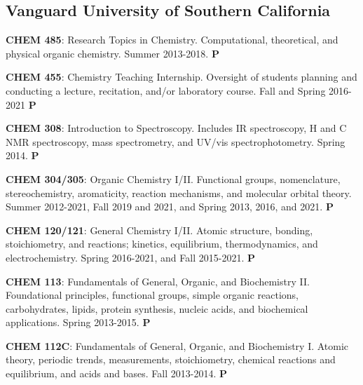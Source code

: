 \documentclass[10pt]{article}
\newcommand*\teitem[4]{\textbf{#1}: #2 #3 \textbf{#4}}
\begin{document}

\subsection*{Vanguard University of Southern California}


\teitem{CHEM 485}{Research Topics in Chemistry. Computational, theoretical, and physical organic chemistry.}{Summer 2013-2018.}{P}

\teitem{CHEM 455}{Chemistry Teaching Internship. Oversight of students planning and conducting a lecture, recitation, and/or laboratory course.}{Fall and Spring 2016-2021}{P}

\teitem{CHEM 308}{Introduction to Spectroscopy. Includes IR spectroscopy, \raisebox{1mm}{\scriptsize 1}H and \raisebox{1mm}{\scriptsize 13}C NMR spectroscopy, mass spectrometry, and UV/vis spectrophotometry.}{Spring 2014.}{P}

\teitem{CHEM 304/305}{Organic Chemistry I/II. Functional groups, nomenclature, stereochemistry, aromaticity, reaction mechanisms, and molecular orbital theory.}{Summer 2012-2021, Fall 2019 and 2021, and Spring 2013, 2016, and 2021.}{P} 

\teitem{CHEM 120/121}{General Chemistry I/II. Atomic structure, bonding, stoichiometry, and reactions; kinetics, equilibrium, thermodynamics, and electrochemistry.}{Spring 2016-2021, and Fall 2015-2021.}{P}

\teitem{CHEM 113}{Fundamentals of General, Organic, and Biochemistry II. Foundational principles, functional groups, simple organic reactions, carbohydrates, lipids, protein synthesis, nucleic acids, and biochemical applications.}{Spring 2013-2015.}{P} 

\teitem{CHEM 112C}{Fundamentals of General, Organic, and Biochemistry I. Atomic theory, periodic trends, measurements, stoichiometry, chemical reactions and equilibrium, and acids and bases.}{Fall 2013-2014.}{P}
\end{document}
